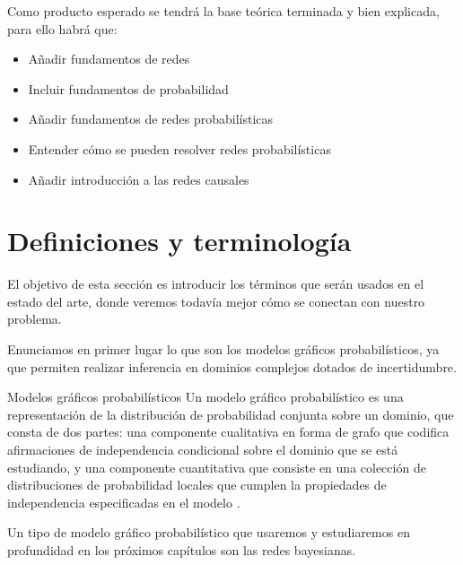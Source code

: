 Como producto esperado se tendrá la base teórica terminada y bien explicada, para ello habrá que: 

\begin{itemize}
    \item Añadir fundamentos de redes
    \item Incluir fundamentos de probabilidad 
    \item Añadir fundamentos de redes probabilísticas 
    \item Entender cómo se pueden resolver redes probabilísticas 
    \item Añadir introducción a las redes causales 
\end{itemize}

\section{Definiciones y terminología}
El objetivo de esta sección es introducir los términos que serán usados en el estado del arte, donde veremos 
todavía mejor cómo se conectan con nuestro problema.

Enunciamos en primer lugar lo que son los modelos gráficos probabilísticos, ya que permiten realizar 
inferencia en dominios complejos dotados de incertidumbre.

\begin{definicion}{Modelos gráficos probabilísticos} \label{subsect:modelos}
Un modelo gráfico probabilístico es una representación de la distribución de probabilidad conjunta 
sobre un dominio, que consta de dos partes: una componente cualitativa
en forma de grafo que codifica afirmaciones de independencia condicional sobre el 
dominio que se está estudiando, y una componente cuantitativa que consiste en una colección de 
distribuciones de probabilidad locales que cumplen la propiedades de independencia especificadas 
en el modelo \cite{inference-rev-hbn}. 
\end{definicion}

Un tipo de modelo gráfico probabilístico que usaremos y estudiaremos en profundidad en los próximos 
capítulos son las redes bayesianas.

